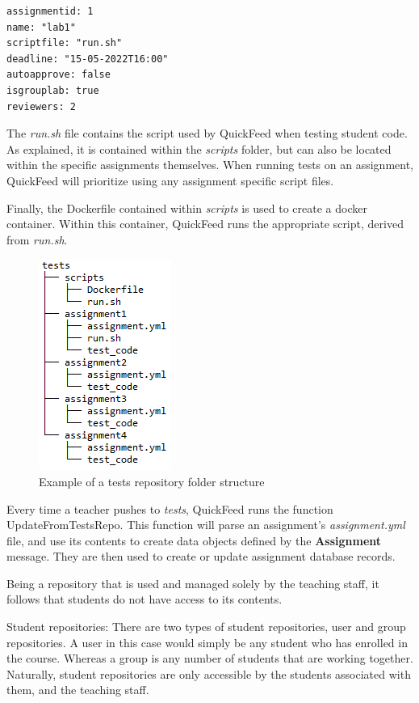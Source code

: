 \begin{lstlisting}[caption={Example contents of an \textit{assignment.yml} file}, numbers=none]
assignmentid: 1
name: "lab1"
scriptfile: "run.sh"
deadline: "15-05-2022T16:00"
autoapprove: false
isgrouplab: true
reviewers: 2
\end{lstlisting}

The \textit{run.sh} file contains the script used by QuickFeed when testing student code.
As explained, it is contained within the \textit{scripts} folder, but can also be located within the specific assignments themselves.
When running tests on an assignment, QuickFeed will prioritize using any assignment specific script files.

Finally, the Dockerfile contained within \textit{scripts} is used to create a docker container.
Within this container, QuickFeed runs the appropriate script, derived from \textit{run.sh}.

\begin{figure}[ht]
    \centering
    \includegraphics[scale=0.8]{photos/tests-repository-structure.PNG}
    \caption{Example of a tests repository folder structure}
    \label{fig:tests-repository-structure}
\end{figure}

Every time a teacher pushes to \textit{tests}, QuickFeed runs the function UpdateFromTestsRepo.
This function will parse an assignment's \textit{assignment.yml} file, and use its contents to create data objects defined by the \textbf{Assignment} message.
They are then used to create or update assignment database records.

Being a repository that is used and managed solely by the teaching staff, it follows that students do not have access to its contents.

Student repositories: There are two types of student repositories, user and group repositories.
A user in this case would simply be any student who has enrolled in the course.
Whereas a group is any number of students that are working together.
Naturally, student repositories are only accessible by the students associated with them, and the teaching staff.

